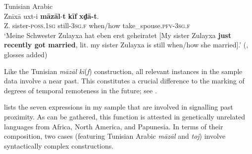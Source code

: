 \begin{exe}
	 Tunisian Arabic\\
	\gll Znīxā uxt-i \textbf{māzāl}-\textbf{t} \textbf{kīf} \textbf{xd̠ā-t}.\\
	Z. sister-\textsc{poss}.1\textsc{sg} still-3\textsc{sg}.\textsc{f} when/how take\_spouse.\textsc{pfv}-3\textsc{sg}.\textsc{f}\\
	\glt \lq Meine Schwester Zulayxa hat eben erst geheiratet [My sister Zulayxa \textbf{just recently got married}, lit. my sister Zulayxa is still when/how she married].' (\cite[651]{Singer1984},  glosses added)
\end{exe}

Like the Tunisian \textit{māzāl} \mbox{\textit{kī}(\textit{f})} construction, all relevant instances in the sample data involve a near past. This constitutes a crucial difference to the marking of degrees of temporal remoteness in the future;  see .

\largerpage[2]
 lists the seven expressions in my sample that are involved in signalling past proximity. As can be gathered, this function is attested in genetically unrelated languages from Africa, North America, and Papunesia. In terms of their composition, two cases (featuring Tunisian Arabic \textit{māzāl} and  \textit{toj}) involve syntactically complex constructions.


